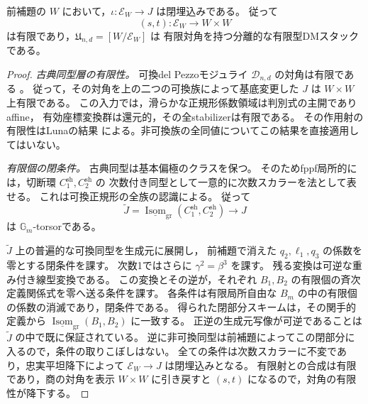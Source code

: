 \begin{theorem}[全可換零切断を含む近傍の有限対角]
\label{thm:zero-neighborhood-finite-diagonal}
前補題の $W$ において，$\iota:\mathcal E_W\to J$ は閉埋込みである。
従って
\[
 (s,t):\mathcal E_W\longrightarrow W\times W
\]
は有限であり，$\mathfrak U_{n,d}=[W/\mathcal E_W]$ は
有限対角を持つ分離的な有限型DMスタックである。
\end{theorem}
\begin{proof}
\emph{古典同型層の有限性。}
可換del Pezzoモジュライ $\mathcal D_{n,d}$ の対角は有限である
\cite[定理9.2，\texttt{thm:affine-coarse-moduli}]{PoissonDP}。
従って，その対角を上の二つの可換族によって基底変更した $J$ は
$W\times W$ 上有限である。
この入力では，滑らかな正規形係数領域は判別式の主開でありaffine，
有効座標変換群は還元的，その全stabilizerは有限である。
その作用射の有限性はLunaの結果\cite[I, \S4, Corollaire, p.~90]{Luna1973}
による。非可換族の全同値についてこの結果を直接適用してはいない。

\emph{有限個の閉条件。}
古典同型は基本偏極のクラスを保つ。
そのためfppf局所的には，切断環 $C^{\mathrm{sh}}_1,C^{\mathrm{sh}}_2$ の
次数付き同型として一意的に次数スカラーを法として表せる。
これは可換正規形の全族の認識\cite[定理8.8]{PoissonDP}による。
従って
\[
 \widetilde J=\underline{\operatorname{Isom}}_{\mathrm{gr}}
          (C^{\mathrm{sh}}_1,C^{\mathrm{sh}}_2)\longrightarrow J
\]
は $\mathbb G_m$-torsorである。

$\widetilde J$ 上の普遍的な可換同型を生成元に展開し，
前補題で消えた $q_2,\ell_1,q_3$ の係数を零とする閉条件を課す。
次数1ではさらに $\gamma^2=\beta^3$ を課す。
残る変換は可逆な重み付き線型変換である。
この変換とその逆が，それぞれ $B_1,B_2$ の有限個の斉次定義関係式を零へ送る条件を課す。
各条件は有限局所自由な $B_m$ の中の有限個の係数の消滅であり，閉条件である。
得られた閉部分スキームは，その関手的定義から
$\underline{\operatorname{Isom}}_{\mathrm{gr}}(B_1,B_2)$ に一致する。
正逆の生成元写像が可逆であることは $\widetilde J$ の中で既に保証されている。
逆に非可換同型は前補題によってこの閉部分に入るので，条件の取りこぼしはない。
全ての条件は次数スカラーに不変であり，忠実平坦降下によって
$\mathcal E_W\to J$ は閉埋込みとなる。
有限射との合成は有限であり，商の対角を表示 $W\times W$ に引き戻すと
$(s,t)$ になるので，対角の有限性が降下する。
\end{proof}

